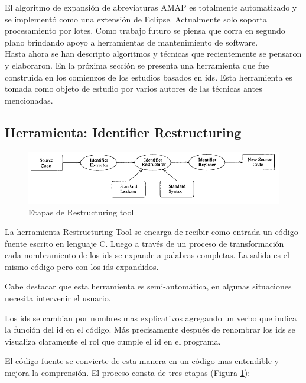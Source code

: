 \documentclass[a4paper,12pt]{report}
\begin{document}
El algoritmo de expansión de abreviaturas AMAP es totalmente automatizado y se implementó como una extensión de Eclipse. Actualmente solo soporta procesamiento por lotes. Como trabajo futuro se piensa que corra en segundo plano brindando apoyo a herramientas de mantenimiento de software\cite{EZH08}.\\

Hasta ahora se han descripto algoritmos y técnicas que recientemente se pensaron y elaboraron. En la próxima sección se presenta una herramienta que fue construida en los comienzos de los estudios basados en ids. Esta herramienta es tomada como objeto de estudio por varios autores de las técnicas antes mencionadas\cite{EZH08,DCHD06,DLHD06,LFBEX07}.


\pagebreak 
\subsection{Herramienta: Identifier Restructuring}

\begin{figure}[h] %
\centerline{%
\includegraphics[scale= 0.80]{./ire_1.png}
}
\caption{Etapas de Restructuring tool}
\label{ire1}
\end{figure}

La herramienta Restructuring Tool\cite{BCPT00} se encarga de recibir como entrada un código fuente escrito en lenguaje C. Luego a través de un proceso de transformación cada nombramiento de los ids se expande a palabras completas. La salida es el mismo código pero con los ids expandidos.

Cabe destacar que esta herramienta es semi-automática, en algunas situaciones necesita intervenir el usuario.

Los ids se cambian por nombres mas explicativos agregando un verbo que indica la función del id en el código. Más precisamente después de renombrar los ids se visualiza claramente el rol que cumple el id en el programa.

El código fuente se convierte de esta manera en un código mas entendible y mejora la comprensión. El proceso consta de tres etapas (Figura \ref{ire1}): 
\end{document}
